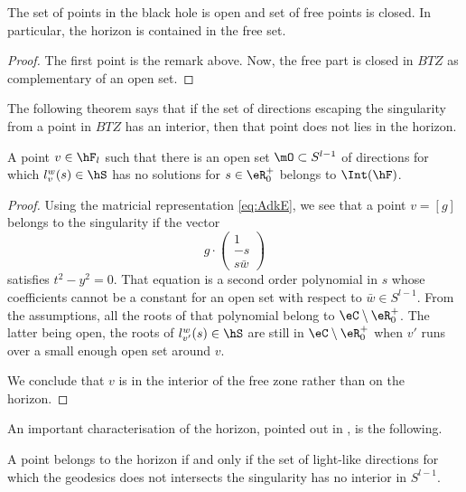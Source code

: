 \begin{proposition}		\label{PropBHouvertLibreFerme}
	The set of points in the black hole is open and set of free points is closed. In particular, the horizon is contained in the free set.
\end{proposition}

\begin{proof}
	The first point is the remark above. Now, the free part is closed in $BTZ$ as complementary of an open set.	
\end{proof}

The following theorem says that if the set of directions escaping the singularity from a point in $BTZ$ has an interior, then that point does not lies in the horizon. 
\begin{proposition}		\label{PropvFOsvghorvec}
	A point $v\in\hF_l$ such that there is an open set $\mO\subset S^{l-1}$ of directions for which $l^{w}_v(s)\in\hS$ has no solutions for $s\in\eR^+_0$ belongs to $\Int(\hF)$.
\end{proposition}

\begin{proof}
	Using the matricial representation \eqref{eq:AdkE}, we see that a point $v=[g]$ belongs to the singularity if the vector
	\begin{equation}
		g\cdot \begin{pmatrix}
			1	\\ 
			-s	\\ 
			s\bar w	
		\end{pmatrix}
	\end{equation}
	satisfies $t^2-y^2=0$. That equation is a second order polynomial in $s$ whose coefficients cannot be a constant for an open set with respect to $\bar w\in S^{l-1}$. From the assumptions, all the roots of that polynomial belong to $\eC\setminus\eR^+_0$. The latter being open, the roots of $l_{v'}^w(s)\in\hS$ are still in $\eC\setminus\eR^+_0$ when $v'$ runs over a small enough open set around $v$.

	We conclude that $v$ is in the interior of the free zone rather than on the horizon.
\end{proof}

An important characterisation of the horizon, pointed out in \cite{Keio}, is the following.
\begin{theorem}		\label{ThoHorIntDansS}
	A point belongs to the horizon if and only if the set of light-like directions for which the geodesics does not intersects the singularity has no interior in $S^{l-1}$.
\end{theorem}


